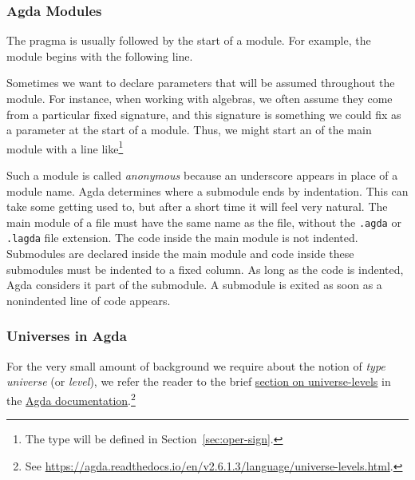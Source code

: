 \subsubsection{Agda Modules}\label{sec:agda-modules}
The  pragma is usually followed by the start of a module.  For example, the  module begins with the following line.
\ccpad
\begin{code}%
\>[0]\AgdaSpace{}%
\AgdaSpace{}%
\<%
\end{code}
\ccpad
Sometimes we want to declare parameters that will be assumed throughout the module.  For instance, when working with algebras, we often assume they come from a particular fixed signature, and this signature is something we could fix as a parameter at the start of a module. Thus, we might start an  of the main module with a line like\footnote{The  type will be defined in Section~\ref{sec:oper-sign}.}
\ccpad
\begin{code}%
\>[0]\AgdaSpace{}%
\AgdaUnderscore\AgdaSpace{}%
\AgdaSymbol{\{}\AgdaSpace{}%
\AgdaSymbol{:}\AgdaSpace{}%
\AgdaSpace{}%
\AgdaSpace{}%
\AgdaSymbol{\}}\AgdaSpace{}%
\<%
\end{code}
\ccpad
Such a module is called \emph{anonymous} because an underscore appears in place of a module name. Agda determines where a submodule ends by indentation.  This can take some getting used to, but after a short time it will feel very natural. The main module of a file must have the same name as the file, without the \texttt{.agda} or \texttt{.lagda} file extension.  The code inside the main module is not indented. Submodules are declared inside the main module and code inside these submodules must be indented to a fixed column.  As long as the code is indented, Agda considers it part of the submodule.  A submodule is exited as soon as a nonindented line of code appears.



\subsubsection{Universes in Agda}\label{universes}

For the very small amount of background we require about the notion of \emph{type universe} (or \emph{level}), we refer the reader to the brief \href{https://agda.readthedocs.io/en/v2.6.1.3/language/universe-levels.html}{section
on universe-levels} in the \href{https://agda.readthedocs.io/en/v2.6.1.3/language/universe-levels.html}{Agda
documentation}.\footnote{See \url{https://agda.readthedocs.io/en/v2.6.1.3/language/universe-levels.html}.}

